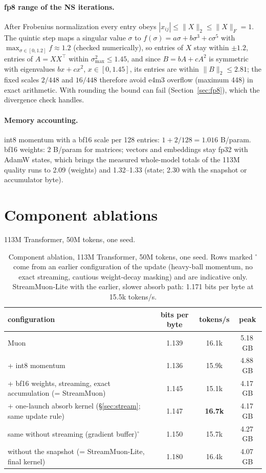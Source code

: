 \documentclass[10pt]{article}
\newcommand{\method}{StreamMuon}\newcommand{\lite}{StreamMuon-Lite}
\begin{document}
\paragraph{fp8 range of the NS iterations.} After Frobenius normalization every entry obeys
$|x_{ij}|\le\|X\|_2\le\|X\|_F=1$. The quintic step maps a singular value $\sigma$ to $f(\sigma)=a\sigma+b\sigma^3+c\sigma^5$
with $\max_{\sigma\in[0,1.2]}f\approx1.2$ (checked numerically), so entries of $X$ stay within $\pm1.2$, entries of
$A=XX^{\top}$ within $\sigma_{\max}^2\le1.45$, and since $B=bA+cA^2$ is symmetric with eigenvalues $bx+cx^2$,
$x\in[0,1.45]$, its entries are within $\|B\|_2\le2.81$; the fixed scales $2/448$ and $16/448$ therefore avoid e4m3
overflow (maximum 448) in exact arithmetic. With rounding the bound can fail (Section~\ref{sec:fp8}),
which the divergence check handles.

\paragraph{Memory accounting.} int8 momentum with a bf16 scale per 128 entries: $1+2/128=1.016$ B/param. bf16 weights: 2 B/param for matrices; vectors
and embeddings stay fp32 with AdamW states, which brings the measured whole-model totals of the 113M quality runs to
2.09 (weights) and 1.32--1.33 (state; 2.30 with the snapshot or accumulator byte).





\FloatBarrier
\section{Component ablations}
\label{app:ablation}
113M Transformer, 50M tokens, one seed.

\begin{table}[!htb]
\centering\small
\caption{Component ablation, 113M Transformer, 50M tokens, one seed. Rows marked $^\circ$ come from an earlier
configuration of the update (heavy-ball momentum, no exact streaming, cautious weight-decay masking) and are indicative
only. \lite{} with the earlier, slower absorb path: 1.171 bits per byte at 15.5k tokens/s.}
\label{tab:ablation}
\begin{tabular}{lccc}
\toprule
configuration & bits per byte & tokens/s & peak \\
\midrule
Muon & 1.139 & 16.1k & 5.18\,GB \\
+ int8 momentum & 1.136 & 15.9k & 4.88\,GB \\
+ bf16 weights, streaming, exact accumulation (= \method{}) & 1.145 & 15.1k & 4.17\,GB \\
\quad + one-launch absorb kernel (\S\ref{sec:stream}; same update rule) & 1.147 & \textbf{16.7k} & 4.17\,GB \\
\quad same without streaming (gradient buffer)$^\circ$ & 1.150 & 15.7k & 4.27\,GB \\
\quad without the snapshot (= \lite{}, final kernel) & 1.180 & 16.4k & 4.07\,GB \\
\bottomrule
\end{tabular}
\end{table}
\end{document}
